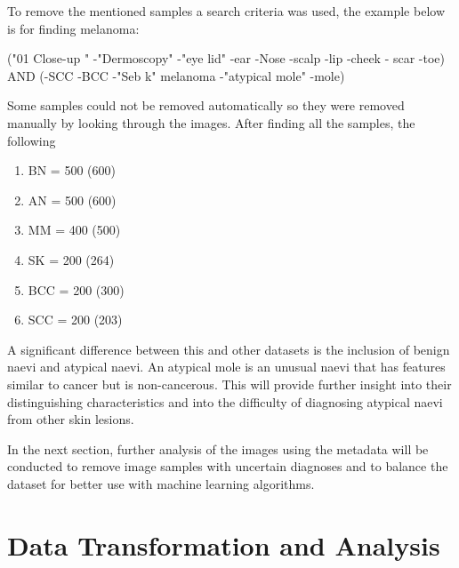 To remove the mentioned samples a search criteria was used, the example below is for finding melanoma:

\begin{center}
("01 Close-up " -"Dermoscopy" -"eye lid" -ear -Nose -scalp -lip -cheek - scar -toe) AND (-SCC -BCC -"Seb k" melanoma -"atypical mole" -mole)
\end{center}

Some samples could not be removed automatically so they were removed manually by looking through the images. After finding all the samples, the following

\begin{enumerate}
\item BN = 500 (600)
\item AN = 500 (600)
\item MM = 400 (500)
\item SK = 200 (264)
\item BCC = 200 (300)
\item SCC = 200 (203)
\end{enumerate}

A significant difference between this and other datasets is the inclusion of benign naevi and atypical naevi. An atypical mole is an unusual naevi that has features similar to cancer but is non-cancerous. This will provide further insight into their distinguishing characteristics and into the difficulty of diagnosing atypical naevi from other skin lesions.

In the next section, further analysis of the images using the metadata will be conducted to remove image samples with uncertain diagnoses and to balance the dataset for better use with machine learning algorithms.

\section{Data Transformation and Analysis}

